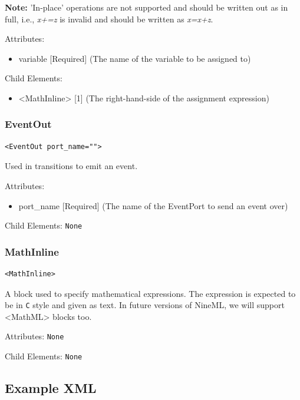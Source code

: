 \documentclass{article}
\newcommand{\note}[1]{%
\begin{center}
\colorbox{issuecolor}{\parbox{0.8\linewidth}{\textbf{Note:} #1}}
\end{center}%
}
\begin{document}
\note{'In-place' operations are not supported and should be written out as in full,
i.e., \textsl{x+=z} is invalid and should be written as \textsl{x=x+z}.}

Attributes:
%
\begin{itemize}
\item variable {[}Required{]} (The name of the variable to be assigned to)
\end{itemize}

Child Elements:
%
\begin{itemize}
\item <MathInline> {[}1{]} (The right-hand-side of the assignment expression)
\end{itemize}

\subsubsection{EventOut}
%
\begin{lstlisting}
<EventOut port_name="">
\end{lstlisting}

Used in transitions to emit an event.

Attributes:
%
\begin{itemize}
\item port\_name {[}Required{]} (The name of the EventPort to send an event over)
\end{itemize}

Child Elements: \texttt{None}

\subsubsection{MathInline}
%
\begin{lstlisting}
<MathInline>
\end{lstlisting}

A block used to specify mathematical expressions. The expression is expected to
be in \texttt{C} style and given as text. In future versions of NineML, we will
support <MathML> blocks too.

Attributes:  \texttt{None}

Child Elements: \texttt{None}

\pagebreak

\subsection{Example XML}
\end{document}

